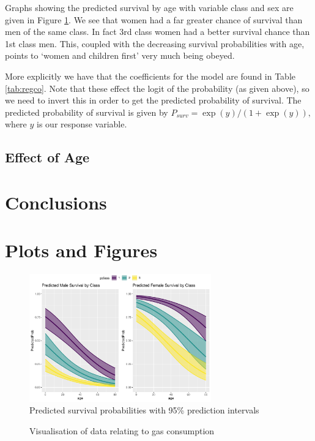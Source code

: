 \documentclass[]{extarticle}
\begin{document}
Graphs showing the predicted survival by age with variable class and sex are given in Figure \ref{fig:psurvage}. We see that women had a far greater chance of survival than men of the same class. In fact 3rd class women had a better survival chance than 1st class men. This, coupled with the decreasing survival probabilities with age, points to `women and children first' very much being obeyed. 

More explicitly we have that the coefficients for the model are found in Table \ref{tab:regco}. Note that these effect the logit of the probability (as given above), so we need to invert this in order to get the predicted probability of survival. The predicted probability of survival is given by $P_{surv} = \exp(y)/(1+\exp(y)),$ where $y$ is our response variable.
\subsection{Effect of Age}

\section{Conclusions}

%

\appendix

\section{Plots and Figures}

\begin{figure}[H]
	\centering
	\includegraphics[width=0.7\textwidth]{psurvage}
	\caption{Predicted survival probabilities with 95\% prediction intervals}
	\label{fig:psurvage}
\end{figure}

\begin{figure}[H]
	\centering
	\caption{Visualisation of data relating to gas consumption}
	\label{fig:datavis}
\end{figure}
\end{document}
